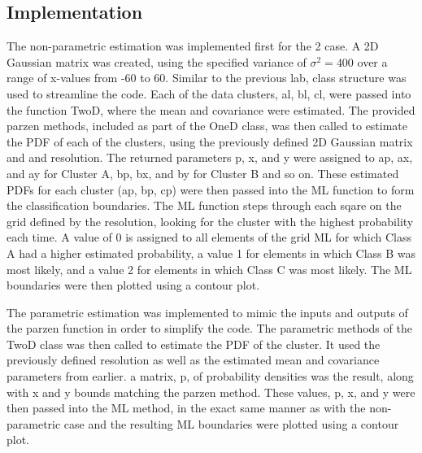 \label{sec:2d}
\subsection{Implementation}
The non-parametric estimation was implemented first for the 2 case.  A 2D Gaussian matrix was created, using the specified variance of $\sigma^2=400$ over a range of x-values from -60 to 60.  Similar to the previous lab, class structure was used to streamline the code.  Each of the data clusters, al, bl, cl, were passed into the function TwoD, where the mean and covariance were estimated.  The provided parzen methods, included as part of the OneD class, was then called to estimate the PDF of each of the clusters, using the previously defined 2D Gaussian matrix and and resolution.  The returned parameters p, x, and y were assigned to ap, ax, and ay for Cluster A, bp, bx, and by for Cluster B and so on.  These estimated PDFs for each cluster (ap, bp, cp) were then passed into the ML function to form the classification boundaries.  The ML function steps through each sqare on the grid defined by the resolution, looking for the cluster with the highest probability each time.  A value of 0 is assigned to all elements of the grid ML for which Class A had a higher estimated probability, a value 1 for elements in which Class B was most likely, and a value 2 for elements in which Class C was most likely.  The ML boundaries were then plotted using a contour plot.  

The parametric estimation was implemented to mimic the inputs and outputs of the parzen function in order to simplify the code.  The parametric methods of the TwoD class was then called to estimate the PDF of the cluster.  It used the previously defined resolution as well as the estimated mean and covariance parameters from earlier.  a matrix, p, of probability densities was the result, along with x and y bounds matching the parzen method.  These values, p, x, and y were then passed into the ML method, in the exact same manner as with the non-parametric case and the resulting ML boundaries were plotted using a contour plot.  

